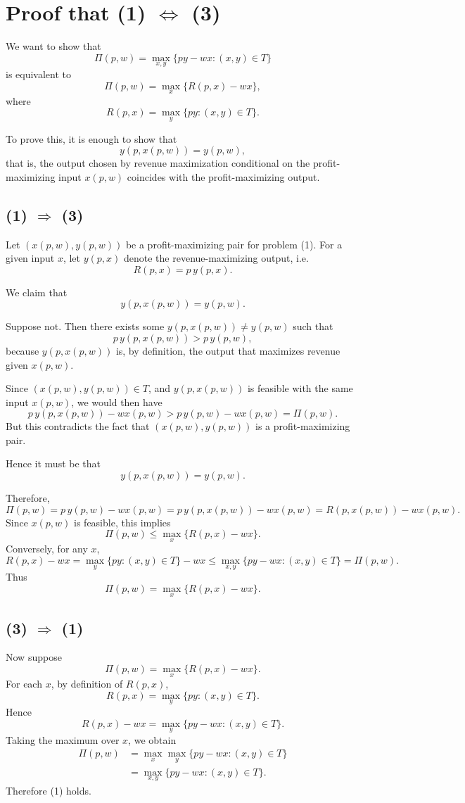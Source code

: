 \section*{Proof that (1) $\iff$ (3)}

We want to show that
\[
\Pi(p,w)=\max_{x,y}\{py-wx:(x,y)\in T\}
\]
is equivalent to
\[
\Pi(p,w)=\max_x\{R(p,x)-wx\},
\]
where
\[
R(p,x)=\max_y\{py:(x,y)\in T\}.
\]

To prove this, it is enough to show that
\[
y(p,x(p,w))=y(p,w),
\]
that is, the output chosen by revenue maximization conditional on the profit-maximizing input \(x(p,w)\) coincides with the profit-maximizing output.

\subsection*{(1) $\Rightarrow$ (3)}

Let \((x(p,w),y(p,w))\) be a profit-maximizing pair for problem (1).  
For a given input \(x\), let \(y(p,x)\) denote the revenue-maximizing output, i.e.
\[
R(p,x)=p\,y(p,x).
\]

We claim that
\[
y(p,x(p,w))=y(p,w).
\]

Suppose not. Then there exists some \(y(p,x(p,w))\neq y(p,w)\) such that
\[
p\,y(p,x(p,w))>p\,y(p,w),
\]
because \(y(p,x(p,w))\) is, by definition, the output that maximizes revenue given \(x(p,w)\).

Since \((x(p,w),y(p,w))\in T\), and \(y(p,x(p,w))\) is feasible with the same input \(x(p,w)\), we would then have
\[
p\,y(p,x(p,w))-w x(p,w)
>
p\,y(p,w)-w x(p,w)
=
\Pi(p,w).
\]
But this contradicts the fact that \((x(p,w),y(p,w))\) is a profit-maximizing pair.

Hence it must be that
\[
y(p,x(p,w))=y(p,w).
\]

Therefore,
\[
\Pi(p,w)
=
p\,y(p,w)-w x(p,w)
=
p\,y(p,x(p,w))-w x(p,w)
=
R(p,x(p,w))-w x(p,w).
\]
Since \(x(p,w)\) is feasible, this implies
\[
\Pi(p,w)\le \max_x\{R(p,x)-wx\}.
\]
Conversely, for any \(x\),
\[
R(p,x)-wx
=
\max_y\{py:(x,y)\in T\}-wx
\le
\max_{x,y}\{py-wx:(x,y)\in T\}
=
\Pi(p,w).
\]
Thus
\[
\Pi(p,w)=\max_x\{R(p,x)-wx\}.
\]

\subsection*{(3) $\Rightarrow$ (1)}

Now suppose
\[
\Pi(p,w)=\max_x\{R(p,x)-wx\}.
\]
For each \(x\), by definition of \(R(p,x)\),
\[
R(p,x)=\max_y\{py:(x,y)\in T\}.
\]
Hence
\[
R(p,x)-wx
=
\max_y\{py-wx:(x,y)\in T\}.
\]
Taking the maximum over \(x\), we obtain
\[
\begin{aligned}
\Pi(p,w)
&=
\max_x\max_y\{py-wx:(x,y)\in T\}\\
&=
\max_{x,y}\{py-wx:(x,y)\in T\}.
\end{aligned}
\]
Therefore (1) holds.

